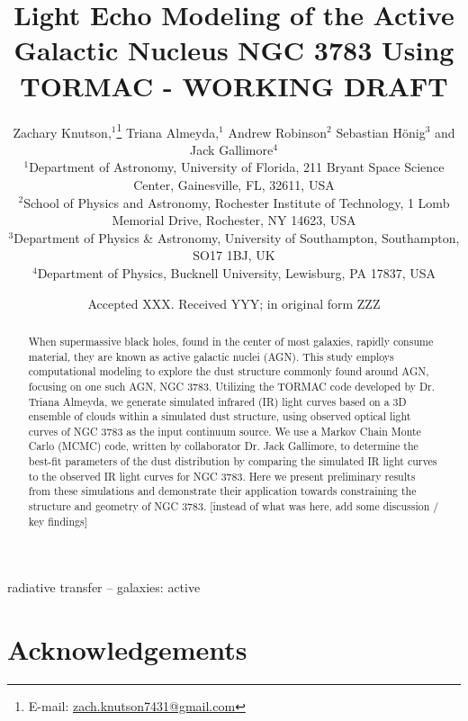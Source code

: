 \documentclass[fleqn,usenatbib]{mnras}
\title[Parameter Estimation of the AGN NGC 3783 Using TORMAC]{Light Echo Modeling of the Active Galactic Nucleus NGC 3783 Using TORMAC - WORKING DRAFT}
\author[Z. Knutson et al.]{
Zachary Knutson,$^{1}$\thanks{E-mail: \href{mailto:zach.knutson7431@gmail.com}{zach.knutson7431@gmail.com}}
Triana Almeyda,$^{1}$
Andrew Robinson$^{2}$
Sebastian Hönig$^{3}$
and Jack Gallimore$^{4}$
\\
$^{1}$Department of Astronomy, University of Florida, 211 Bryant Space Science Center, Gainesville, FL, 32611, USA\\
$^{2}$School of Physics and Astronomy, Rochester Institute of Technology, 1 Lomb Memorial Drive, Rochester, NY 14623, USA\\
$^{3}$Department of Physics \& Astronomy, University of Southampton, Southampton, SO17 1BJ, UK\\
$^{4}$Department of Physics, Bucknell University, Lewisburg, PA 17837, USA
}
\date{Accepted XXX. Received YYY; in original form ZZZ}
\begin{document}
\label{firstpage}
\pagerange{\pageref{firstpage}--\pageref{lastpage}}
\maketitle

\begin{abstract}
When supermassive black holes, found in the center of most galaxies, rapidly consume material, they are known as active galactic nuclei (AGN). This study employs computational modeling to explore the dust structure commonly found around AGN, focusing on one such AGN, NGC 3783. Utilizing the TORMAC code developed by Dr. Triana Almeyda, we generate simulated infrared (IR) light curves based on a 3D ensemble of clouds within a simulated dust structure, using observed optical light curves of NGC 3783 as the input continuum source. We use a Markov Chain Monte Carlo (MCMC) code, written by collaborator Dr. Jack Gallimore, to determine the best-fit parameters of the dust distribution by comparing the simulated IR light curves to the observed IR light curves for NGC 3783. Here we present preliminary results from these simulations and demonstrate their application towards constraining the structure and geometry of NGC 3783. [instead of what was here, add some discussion / key findings] 
\end{abstract}

\begin{keywords}
radiative transfer -- galaxies: active
\end{keywords}








\section*{Acknowledgements}

\end{document}
